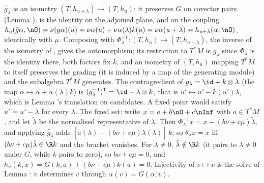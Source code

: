 $\hat g_\lambda$ is an isometry $(T, h_{u+\lambda}) \to (T, h_u)$: it preserves $G$ on covector pairs (Lemma ), is the identity on the adjoined plane, and on the coupling $h_u(\hat g\alpha, \nO) = \nu(g\alpha)(u) = \nu\alpha(u) + \nu\alpha(\lambda)k(u) = \nu\alpha(u+\lambda) = h_{u+\lambda}(\alpha, \nO)$, identically with $\mu$. Composing with $\Phi_\lambda^{-1} : (T, h_u) \to (T, h_{u+\lambda})$, the inverse of the isometry of , gives the automorphism; its restriction to $T^*M$ is $g_\lambda$ since $\Phi_\lambda$ is the identity there, both factors fix $k$, and an isometry of $(T, h_u)$ mapping $T^*M$ to itself preserves the grading (it is induced by a map of the generating module) and the subalgebra $T^*M$ generates. The contragredient of $g_\lambda = \id + k \otimes \lambda$ (the map $\alpha \mapsto \alpha + \alpha(\lambda)k$) is $(g_\lambda^{-1})^{\mathsf{T}} = \id - \lambda \otimes k$, that is $u' \mapsto u' - k(u')\lambda$, which is Lemma 's translation on candidates. A fixed point would satisfy $u' = u' - \lambda$ for every $\lambda$. The fixed set: write $x = a + b\nO + c\nInf$ with $a \in T^*M$, and let $\tilde\lambda$ be the normalised representative of $\lambda$. Then $\Phi_\lambda^{-1}x = x - (b\nu + c\mu)\tilde\lambda$, and applying $\hat g_\lambda$ adds $[a(\lambda) - (b\nu + c\mu)\tilde\lambda(\lambda)]\,k$; so $\theta_\lambda x = x$ iff $(b\nu + c\mu)\tilde\lambda \in \R k$ and the bracket vanishes. For $\lambda \neq 0$, $\tilde\lambda \notin \R k$ (it pairs to $\lambda \neq 0$ under $G$, while $k$ pairs to zero), so $b\nu + c\mu = 0$, and $h_u(k, x) = G(k, a) + (b\nu + c\mu)k(u) = 0$. Injectivity of $v \mapsto \tilde v$ is the solve of Lemma : $\tilde v$ determines $v$ through $\alpha(v) = G(\alpha, \tilde v)$.
